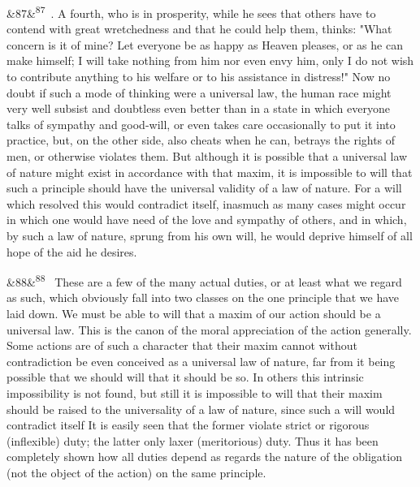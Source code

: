 \documentclass[12pt]{article}
\newcommand{\para}[1][]{\par\noindent\ifx&#1&\else\textsuperscript{\footnotesize #1}~\fi}
\begin{document}
\para[87] 4. A fourth, who is in prosperity, while he sees that others have to contend with great wretchedness and that he could help them, thinks: "What concern is it of mine? Let everyone be as happy as Heaven pleases, or as he can make himself; I will take nothing from him nor even envy him, only I do not wish to contribute anything to his welfare or to his assistance in distress!" Now no doubt if such a mode of thinking were a universal law, the human race might very well subsist and doubtless even better than in a state in which everyone talks of sympathy and good-will, or even takes care occasionally to put it into practice, but, on the other side, also cheats when he can, betrays the rights of men, or otherwise violates them. But although it is possible that a universal law of nature might exist in accordance with that maxim, it is impossible to will that such a principle should have the universal validity of a law of nature. For a will which resolved this would contradict itself, inasmuch as many cases might occur in which one would have need of the love and sympathy of others, and in which, by such a law of nature, sprung from his own will, he would deprive himself of all hope of the aid he desires.

\para[88] These are a few of the many actual duties, or at least what we regard as such, which obviously fall into two classes on the one principle that we have laid down. We must be able to will that a maxim of our action should be a universal law. This is the canon of the moral appreciation of the action generally. Some actions are of such a character that their maxim cannot without contradiction be even conceived as a universal law of nature, far from it being possible that we should will that it should be so. In others this intrinsic impossibility is not found, but still it is impossible to will that their maxim should be raised to the universality of a law of nature, since such a will would contradict itself It is easily seen that the former violate strict or rigorous (inflexible) duty; the latter only laxer (meritorious) duty. Thus it has been completely shown how all duties depend as regards the nature of the obligation (not the object of the action) on the same principle.
\end{document}
